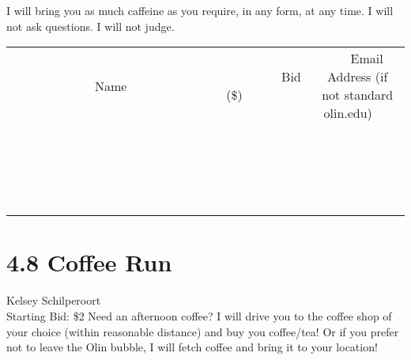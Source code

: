\documentclass[11pt]{article}
\begin{document}
I will bring you as much caffeine as you require, in any form, at any time. I will not ask questions. I will not judge.
\\[3ex]
\begin{tabular}{c c c}
~~~~~~~~~~~~~Name~~~~~~~~~~~~~ & ~~~~~~~~~Bid (\$)~~~~~~~~~  & ~~~Email Address (if not standard olin.edu)~~~\\
 & & \\
\hline
 & & \\
\hline
 & & \\
\hline
 & & \\
\hline
 & & \\
\hline
 & & \\
\hline
 & & \\
\hline
 & & \\
\hline
 & & \\
\hline
 & & \\
\hline
 & & \\
\hline
 & & \\
\hline
 & & \\
\hline
 & & \\
\hline
 & & \\
\hline
 & & \\
\hline
 & & \\
\hline
 & & \\
\hline
 & & \\
\hline
\end{tabular}
\newpage
\section*{4.8 Coffee Run}
Kelsey Schilperoort
\\
Starting Bid: \$2
\newline
Need an afternoon coffee? I will drive you to the coffee shop of your choice (within reasonable distance) and buy you coffee/tea! Or if you prefer not to leave the Olin bubble, I will fetch coffee and bring it to your location! 
\end{document}
